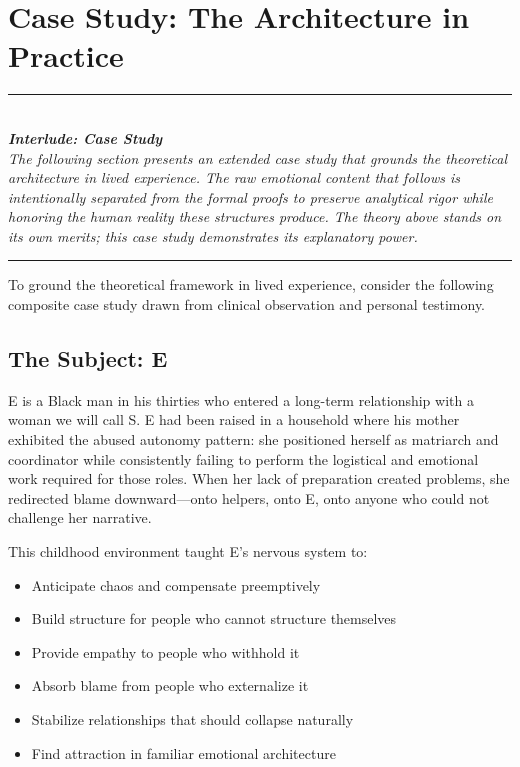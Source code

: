 \documentclass[12pt,openany]{book}
\numberwithin{equation}{chapter}
\begin{document}
\section{Case Study: The Architecture in Practice}

\begin{center}
\rule{0.5\textwidth}{0.4pt}\\[0.5em]
\textit{\textbf{Interlude: Case Study}}\\[0.3em]
\textit{The following section presents an extended case study that grounds the theoretical architecture in lived experience. The raw emotional content that follows is intentionally separated from the formal proofs to preserve analytical rigor while honoring the human reality these structures produce. The theory above stands on its own merits; this case study demonstrates its explanatory power.}\\[0.5em]
\rule{0.5\textwidth}{0.4pt}
\end{center}

\vspace{1em}

To ground the theoretical framework in lived experience, consider the following composite case study drawn from clinical observation and personal testimony.

\subsection{The Subject: E}

E is a Black man in his thirties who entered a long-term relationship with a woman we will call S. E had been raised in a household where his mother exhibited the abused autonomy pattern: she positioned herself as matriarch and coordinator while consistently failing to perform the logistical and emotional work required for those roles. When her lack of preparation created problems, she redirected blame downward---onto helpers, onto E, onto anyone who could not challenge her narrative.

This childhood environment taught E's nervous system to:
\begin{itemize}
    \item Anticipate chaos and compensate preemptively
    \item Build structure for people who cannot structure themselves
    \item Provide empathy to people who withhold it
    \item Absorb blame from people who externalize it
    \item Stabilize relationships that should collapse naturally
    \item Find attraction in familiar emotional architecture
\end{itemize}
\end{document}
